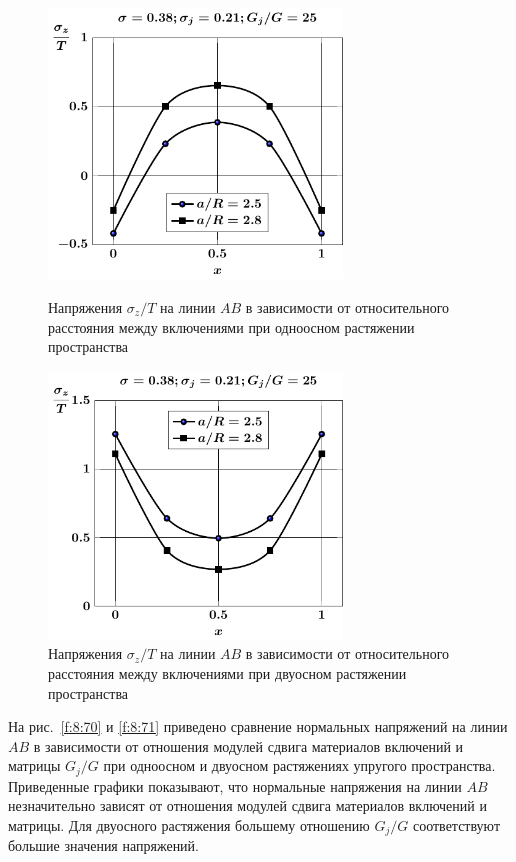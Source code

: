 \begin{figure}[h!]
\centering\footnotesize
\parbox[b]{7.5cm}{\centering\includegraphics[width=7.8cm]{inc9-a-d95-g25-t1-sig_z.pdf}
\caption{Напряжения $\sigma_z/T$ на линии  $AB$ в зависимости от относительного расстояния между включениями при одноосном растяжении пространства
\label{f:8:68}}}\hfil\hfil
\parbox[b]{7.5cm}{\centering\includegraphics[width=7.8cm]{inc9-a-d95-g25-t2-sig_z.pdf}
\caption{Напряжения $\sigma_z/T$ на линии  $AB$ в зависимости от относительного расстояния между включениями при двуосном растяжении пространства
\label{f:8:69}}}
\end{figure}

На рис.~\ref{f:8:70} и \ref{f:8:71} приведено сравнение нормальных напряжений на линии $AB$ в зависимости от отношения модулей сдвига материалов включений и матрицы $G_j/G$ при одноосном и двуосном растяжениях упругого пространства. Приведенные графики показывают, что нормальные напряжения на линии $AB$ незначительно зависят от отношения модулей сдвига материалов включений и матрицы. Для двуосного растяжения большему отношению $G_j/G$ соответствуют большие значения напряжений.

